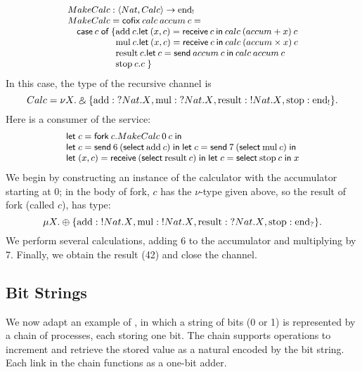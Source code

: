 \documentclass[orivec,envcountsame]{llncs}
\makeatletter
\newcommand{\with}{\mathbin\binampersand}
\newcommand{\gvout}[2]{{!#1.#2}}
\newcommand{\gvin}[2]{{?#1.#2}}
\newcommand{\uto}{\ensuremath{\rightarrow}}
\newcommand{\outterm}{\mathrm{end}_!}
\newcommand{\interm}{\mathrm{end}_?}
\newcommand{\mkwd}[1]{\mathsf{#1}}
\newcommand{\tkwd}[1]{\textsf{#1}}
\newcommand{\clabel}[1]{\mathrm{#1}}
\newcommand{\gvsend}[2]{\mkwd{send}\:#1\:#2}
\newcommand{\gvreceive}[1]{\mkwd{receive}\:#1}
\newcommand{\gvlet}[3]{\mkwd{let}\;#1 = #2\;\mkwd{in}\;#3}
\newcommand{\gvselect}[2]{\mkwd{select}\:#1\:#2}
\newcommand{\gvfork}[2]{\mkwd{fork}\:#1.#2}
\newcommand{\lrkwd}{\mkwd{cofix}}
\newcommand{\ba}{\begin{array}}
\newcommand{\ea}{\end{array}}
\newcommand{\bl}{\ba[t]{@{}l@{}}}
\newcommand{\el}{\ea}
\newcommand{\todo}[1]{{\noindent\small\color{red} \framebox{\parbox{\dimexpr\linewidth-2\fboxsep-2\fboxrule}{\textbf{TODO:} #1}}}}
\makeatother
\begin{document}
\[\small
\bl
MakeCalc : \langle Nat, Calc \rangle \uto \outterm \\
MakeCalc = \lrkwd\:calc\:accum\:c = \\
\quad
  \bl
  \mkwd{case}\:c\;\mkwd{of}\:\{
    \bl
    \clabel{add}\:c.
      \bl
      \mkwd{let}\:(x,c) = \gvreceive{c} \: \mkwd{in}\:
      calc\:(accum + x)\:c \\
      \el \\
    \clabel{mul}\:c.
      \bl
      \mkwd{let}\:(x,c) = \gvreceive{c}\:\mkwd{in}\:
      calc\:(accum \times x)\:c \\
      \el \\
    \clabel{result}\:c.
      \bl
      \mkwd{let}\:c = \gvsend{accum}{c}\:\mkwd{in}\:
      calc\:accum\:c \\
      \el \\
    \clabel{stop}\:c.c \; \}
    \el \\
  \el \\
\el
\]
In this case, the type of the recursive channel is
\[\small
 Calc = \nu X. \with \{ \clabel{add}: \gvin{Nat}{X},
                        \clabel{mul}: \gvin{Nat}{X},
                        \clabel{result}: \gvout{Nat}{X},
                        \clabel{stop}: \outterm \}.
\]%
Here is a consumer of the service:
\[\small
\bl
  \gvlet{c}{\gvfork{c}{MakeCalc\:0\:c}}{} \\
  \gvlet{c}{\gvsend{6}{(\gvselect{\clabel{add}}{c})}}{
  \gvlet{c}{\gvsend{7}{(\gvselect{\clabel{mul}}{c})}}{}} \\
  \gvlet{(x,c)}{\gvreceive{(\gvselect{\clabel{result}}{c})}}{
  \gvlet{c}{\gvselect{\clabel{stop}}{c}}{x}}
\el
\]
We begin by constructing an instance of the calculator with the accumulator starting at 0; in the
body of \tkwd{fork}, $c$ has the $\nu$-type given above, so the result of \tkwd{fork} (called
$c$), has type:
\[\small
\mu X. \oplus \{ \clabel{add}: \gvout{Nat}{X}, \clabel{mul}: \gvout{Nat}{X}, \clabel{result}: \gvin{Nat}{X}, \clabel{stop}: \interm \}.
\]
We perform several calculations, adding 6 to the accumulator and multiplying by 7.  Finally, we
obtain the result (42) and close the channel.

\subsection{Bit Strings}
%

We now adapt an example of \citet{Toninho13}, in which a string of bits (0 or 1) is represented by a
chain of processes, each storing one bit. The chain supports operations to increment and retrieve
the stored value as a natural encoded by the bit string. Each link in the chain functions as a
one-bit adder.
\end{document}
